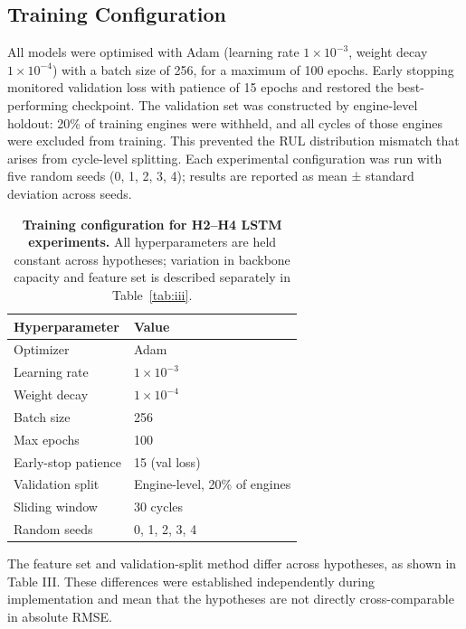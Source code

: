 \documentclass[preprint,10pt]{elsarticle}
\begin{document}
\subsection{Training Configuration}

All models were optimised with Adam (learning rate $1\times10^{-3}$, weight decay $1\times10^{-4}$) with a batch size of 256, for a maximum of 100 epochs. Early stopping monitored validation loss with patience of 15 epochs and restored the best-performing checkpoint. The validation set was constructed by engine-level holdout: 20\% of training engines were withheld, and all cycles of those engines were excluded from training. This prevented the RUL distribution mismatch that arises from cycle-level splitting. Each experimental configuration was run with five random seeds (0, 1, 2, 3, 4); results are reported as mean ± standard deviation across seeds.

\begin{table}[!t]
\centering
\small
\caption*{\textbf{Training configuration for H2--H4 LSTM experiments.} All hyperparameters are held constant across hypotheses; variation in backbone capacity and feature set is described separately in Table~\ref{tab:iii}.}
\label{tab:5}
\begin{tabular}{ll}
\toprule
\textbf{Hyperparameter} & \textbf{Value} \\
\midrule
Optimizer & Adam \\
Learning rate & $1\times10^{-3}$ \\
Weight decay & $1\times10^{-4}$ \\
Batch size & 256 \\
Max epochs & 100 \\
Early-stop patience & 15 (val loss) \\
Validation split & Engine-level, 20\% of engines \\
Sliding window & 30 cycles \\
Random seeds & {0, 1, 2, 3, 4} \\
\bottomrule
\end{tabular}
\end{table}


The feature set and validation-split method differ across hypotheses, as shown in Table III. These differences were established independently during implementation and mean that the hypotheses are not directly cross-comparable in absolute RMSE.
\end{document}
